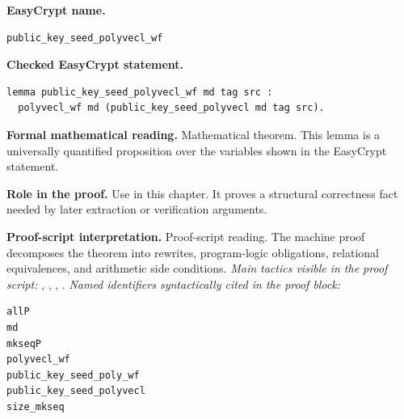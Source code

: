 \begin{formaltheorem}
\noindent\textbf{EasyCrypt name.}
\begin{lstlisting}[language=EasyCrypt,basicstyle=\ttfamily\scriptsize]
public_key_seed_polyvecl_wf
\end{lstlisting}
\noindent\textbf{Checked EasyCrypt statement.}
\begin{lstlisting}[language=EasyCrypt,basicstyle=\ttfamily\scriptsize]
lemma public_key_seed_polyvecl_wf md tag src :
  polyvecl_wf md (public_key_seed_polyvecl md tag src).
\end{lstlisting}
\noindent\textbf{Formal mathematical reading.}
Mathematical theorem. This lemma is a universally quantified proposition over the variables shown in the EasyCrypt statement.

\noindent\textbf{Role in the proof.}
Use in this chapter. It proves a structural correctness fact needed by later extraction or verification arguments.

\noindent\textbf{Proof-script interpretation.}
Proof-script reading. The machine proof decomposes the theorem into rewrites, program-logic obligations, relational equivalences, and arithmetic side conditions.
\emph{Main tactics visible in the proof script:} , , , .
\emph{Named identifiers syntactically cited in the proof block:}
\begin{lstlisting}[language=EasyCrypt,basicstyle=\ttfamily\scriptsize]
allP
md
mkseqP
polyvecl_wf
public_key_seed_poly_wf
public_key_seed_polyvecl
size_mkseq
\end{lstlisting}

\end{formaltheorem}

